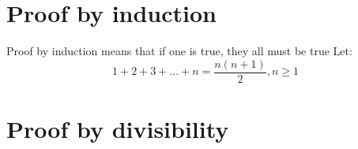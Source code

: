 \documentclass{book}
\newenvironment{generalInformation}{}{}
\newenvironment{example}{}{}
\begin{document}
\section{Proof by induction}
\begin{generalInformation}
    Proof by induction means that if one is true, they all must be true 
\end{generalInformation}
\begin{example}
    Let:
    \[
        1 + 2 + 3 + ... + n = \frac{n(n + 1)}{2}, n \geqslant  1
    \]
    
\end{example}

\section{Proof by divisibility}
\end{document}
